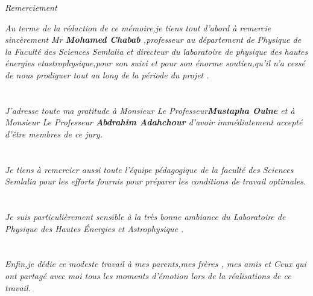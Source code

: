  
\begin{center}
\begin{LARGE}
	\textit{Remerciement\vspace*{2cm}}\\
\end{LARGE}

\end{center}

\textit{ Au terme de la rédaction de ce mémoire,je tiens tout d'abord à remercie sincèrement Mr \textbf{Mohamed Chabab} ,professeur au département de Physique de la Faculté des Sciences Semlalia et directeur du laboratoire de physique des hautes énergies etastrophysique,pour son suivi et pour son énorme soutien,qu'il n'a cessé de nous prodiguer tout au long de la période du projet .\\
	\\
	\\
	J'adresse toute ma gratitude à Monsieur Le Professeur\textbf{Mustapha Oulne}  et à Monsieur Le
	Professeur \textbf{Abdrahim Adahchour}  d'avoir immédiatement accepté d'être membres de ce jury.\\
	\\
	\\
	Je tiens à remercier aussi toute l’équipe pédagogique de la faculté des Sciences Semlalia pour
	les efforts fournis pour préparer les conditions de travail optimales.\\
	\\
	\\
	Je suis particulièrement sensible à la très bonne ambiance du Laboratoire de Physique des Hautes
	Énergies et Astrophysique .\\
	\\
	\\
	Enfin,je dédie ce modeste travail à mes parents,mes frères , mes amis et Ceux qui ont partagé avec moi tous les moments d'émotion lors de la réalisations de ce travail.}
